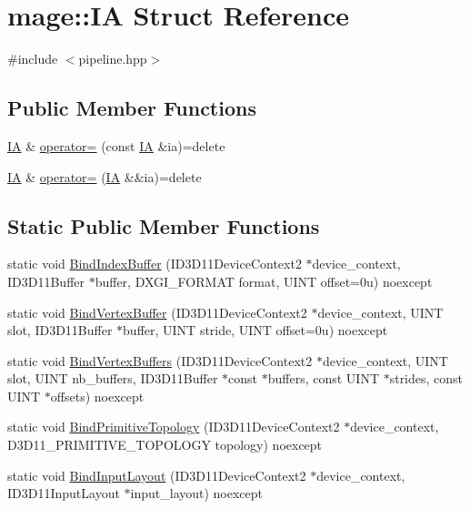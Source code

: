 \hypertarget{structmage_1_1_i_a}{}\section{mage\+:\+:IA Struct Reference}
\label{structmage_1_1_i_a}


{\ttfamily \#include $<$pipeline.\+hpp$>$}

\subsection*{Public Member Functions}
\begin{DoxyCompactItemize}
\item 
\hyperlink{structmage_1_1_i_a}{IA} \& \hyperlink{structmage_1_1_i_a_af1a0feb31c4fbd961812a4768dbfad31}{operator=} (const \hyperlink{structmage_1_1_i_a}{IA} \&ia)=delete
\item 
\hyperlink{structmage_1_1_i_a}{IA} \& \hyperlink{structmage_1_1_i_a_a871eeb0b10aa559545e3c1b03c61387a}{operator=} (\hyperlink{structmage_1_1_i_a}{IA} \&\&ia)=delete
\end{DoxyCompactItemize}
\subsection*{Static Public Member Functions}
\begin{DoxyCompactItemize}
\item 
static void \hyperlink{structmage_1_1_i_a_a9b879b080edb61fc6a92aeb9046d5811}{Bind\+Index\+Buffer} (I\+D3\+D11\+Device\+Context2 $\ast$device\+\_\+context, I\+D3\+D11\+Buffer $\ast$buffer, D\+X\+G\+I\+\_\+\+F\+O\+R\+M\+AT format, U\+I\+NT offset=0u) noexcept
\item 
static void \hyperlink{structmage_1_1_i_a_adb567da46ff80b37b73b07109967db72}{Bind\+Vertex\+Buffer} (I\+D3\+D11\+Device\+Context2 $\ast$device\+\_\+context, U\+I\+NT slot, I\+D3\+D11\+Buffer $\ast$buffer, U\+I\+NT stride, U\+I\+NT offset=0u) noexcept
\item 
static void \hyperlink{structmage_1_1_i_a_a7a48695f4ac2a28dfe02477d4ebd8a02}{Bind\+Vertex\+Buffers} (I\+D3\+D11\+Device\+Context2 $\ast$device\+\_\+context, U\+I\+NT slot, U\+I\+NT nb\+\_\+buffers, I\+D3\+D11\+Buffer $\ast$const $\ast$buffers, const U\+I\+NT $\ast$strides, const U\+I\+NT $\ast$offsets) noexcept
\item 
static void \hyperlink{structmage_1_1_i_a_a72c6a09ee515a2618716aa9bba6e0490}{Bind\+Primitive\+Topology} (I\+D3\+D11\+Device\+Context2 $\ast$device\+\_\+context, D3\+D11\+\_\+\+P\+R\+I\+M\+I\+T\+I\+V\+E\+\_\+\+T\+O\+P\+O\+L\+O\+GY topology) noexcept
\item 
static void \hyperlink{structmage_1_1_i_a_a78152baab8a1f0cd08c27ca5bda7c11e}{Bind\+Input\+Layout} (I\+D3\+D11\+Device\+Context2 $\ast$device\+\_\+context, I\+D3\+D11\+Input\+Layout $\ast$input\+\_\+layout) noexcept
\end{DoxyCompactItemize}
